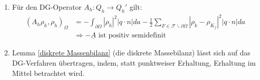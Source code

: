 \begin{remark}
	\begin{enumerate} 
		\item Für den DG-Operator $A_h: Q_h \rightarrow Q_h'$ gilt: 	\newline
		\begin{align*}
			(A_h\rho_h,\rho_h)_{\Omega} &= - \int_{\partial 	\Omega} | \rho_h | ^2 | q \cdot n | da - \frac{1}{2} \sum_{F 	\in \mathcal{F} \backslash \partial \Omega} | \rho_k - 	\rho_{K_f} |^2 |q \cdot n| da \\
			&\Rightarrow - \underline{A} \text{ ist positiv 	semidefinit}
		\end{align*}
		\item Lemma \ref{diskrete Massenbilanz} (die diskrete Massebilanz) lässt sich auf das DG-Verfahren übertragen, indem, statt punktweiser Erhaltung, Erhaltung im Mittel betrachtet wird.
	\end{enumerate}
\end{remark}